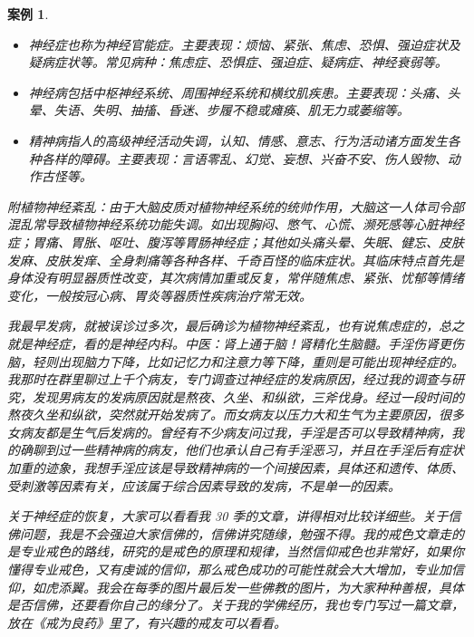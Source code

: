 \documentclass{ctexart}
\newtheorem{case}{案例}
\begin{document}
\begin{case}
\begin{itemize}
    \item 神经症也称为神经官能症。主要表现：烦恼、紧张、焦虑、恐惧、强迫症状及疑病症状等。常见病种：焦虑症、恐惧症、强迫症、疑病症、神经衰弱等。
    \item 神经病包括中枢神经系统、周围神经系统和横纹肌疾患。主要表现：头痛、头晕、失语、失明、抽搐、昏迷、步履不稳或瘫痪、肌无力或萎缩等。
    \item 精神病指人的高级神经活动失调，认知、情感、意志、行为活动诸方面发生各种各样的障碍。主要表现：言语零乱、幻觉、妄想、兴奋不安、伤人毁物、动作古怪等。
\end{itemize}

    附植物神经紊乱：由于大脑皮质对植物神经系统的统帅作用，大脑这一人体司令部混乱常导致植物神经系统功能失调。如出现胸闷、憋气、心慌、濒死感等心脏神经症；胃痛、胃胀、呕吐、腹泻等胃肠神经症；其他如头痛头晕、失眠、健忘、皮肤发麻、皮肤发痒、全身刺痛等各种各样、千奇百怪的临床症状。其临床特点首先是身体没有明显器质性改变，其次病情加重或反复，常伴随焦虑、紧张、忧郁等情绪变化，一般按冠心病、胃炎等器质性疾病治疗常无效。

    我最早发病，就被误诊过多次，最后确诊为植物神经紊乱，也有说焦虑症的，总之就是神经症，看的是神经内科。中医：肾上通于脑！肾精化生脑髓。手淫伤肾更伤脑，轻则出现脑力下降，比如记忆力和注意力等下降，重则是可能出现神经症的。我那时在群里聊过上千个病友，专门调查过神经症的发病原因，经过我的调查与研究，发现男病友的发病原因就是熬夜、久坐、和纵欲，三斧伐身。经过一段时间的熬夜久坐和纵欲，突然就开始发病了。而女病友以压力大和生气为主要原因，很多女病友都是生气后发病的。曾经有不少病友问过我，手淫是否可以导致精神病，我的确聊到过一些精神病的病友，他们也承认自己有手淫恶习，并且在手淫后有症状加重的迹象，我想手淫应该是导致精神病的一个间接因素，具体还和遗传、体质、受刺激等因素有关，应该属于综合因素导致的发病，不是单一的因素。

    关于神经症的恢复，大家可以看看我 30 季的文章，讲得相对比较详细些。关于信佛问题，我是不会强迫大家信佛的，信佛讲究随缘，勉强不得。我的戒色文章走的是专业戒色的路线，研究的是戒色的原理和规律，当然信仰戒色也非常好，如果你懂得专业戒色，又有虔诚的信仰，那么戒色成功的可能性就会大大增加，专业加信仰，如虎添翼。我会在每季的图片最后发一些佛教的图片，为大家种种善根，具体是否信佛，还要看你自己的缘分了。关于我的学佛经历，我也专门写过一篇文章，放在《戒为良药》里了，有兴趣的戒友可以看看。
\end{case}
\end{document}

